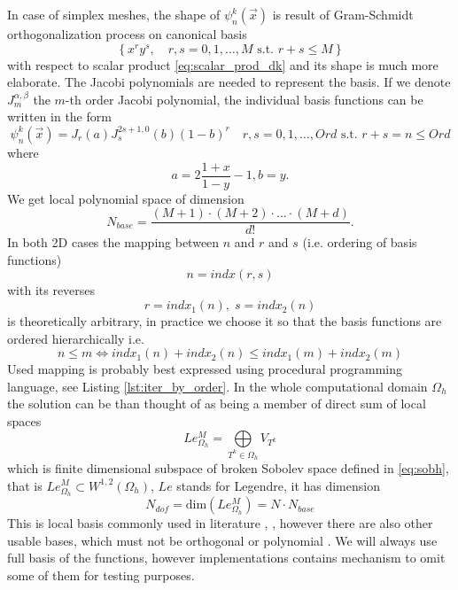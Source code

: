 In case of simplex meshes, the shape of $\psi_n^k(\vec{x})$ is result of 
Gram-Schmidt orthogonalization process on canonical basis 
$$
\left\{ x^ry^s,  \quad r, s = 0,1, \dots, M \text{ s.t. } r + s \leq M\right\}
$$
with respect to scalar product \eqref{eq:scalar_prod_dk}
and its shape is much more elaborate. The Jacobi polynomials are needed to 
represent the basis. If we denote $J^{\alpha, \beta}_m$ the $m$-th order 
Jacobi polynomial, the individual basis functions can be written in the form 
\cite{Hesthaven2008}
\begin{equation}
    \psi_n^k(\vec{x}) = J_r(a)J^{2s+1, 0}_s(b)(1 - b)^r\quad r, s = 0,1, \dots, 
    Ord \text{ s.t. } r + s = n \leq Ord
\end{equation}
where
\begin{equation}
    a = 2 \frac{1 + x}{1 - y} - 1, b = y.
\end{equation}
We get local polynomial space of dimension
\begin{equation}
N_{base} =  \frac{(M + 1) \cdot (M + 2) \cdot ... \cdot (M + d)}{d!}.
\end{equation}
In both 2D cases the mapping between $n$ and $r$ and $s$ (i.e. ordering of 
basis functions) 
\begin{equation}
\label{eq:bindx}
n = indx(r, s)
\end{equation}
with its reverses
\begin{equation}
r = indx_1(n),\; s = indx_2(n)
\end{equation}
is theoretically arbitrary, in practice we choose it so that the basis 
functions are ordered hierarchically i.e.
\begin{equation}
n \leq m \Leftrightarrow indx_1(n) + indx_2(n) \leq indx_1(m) + indx_2(m)
\end{equation}
Used mapping is probably best expressed using procedural programming language,
see Listing \ref{lst:iter_by_order}.
In the whole computational domain $\Omega_h$ the solution can be than thought 
of as being a member of direct sum of local spaces
\begin{equation}
    Le_{\Omega_h}^{M} = \bigoplus\limits_{T^k \in \Omega_h} V_{T^k}
\end{equation}
which is finite dimensional subspace of broken Sobolev space defined in 
\eqref{eq:sobh}, 
that is $Le_{\Omega_h}^{M} \subset  W^{1,2}(\Omega_h)$, $Le$ stands for Legendre, it has 
dimension
\begin{equation}\label{eq:dim_legh}
    N_{dof} = \text{dim}(Le_{\Omega_h}^{M}) = N\cdot N_{base}
\end{equation}
This is local basis commonly used in literature \cite{Hesthaven2008}, 
\cite{Bokhove2008}, however there are also other usable bases, which must not 
be orthogonal or polynomial \cite{Yuan2006}. We will always use full 
basis of the functions, however implementations contains mechanism to omit 
some of them for testing purposes.

